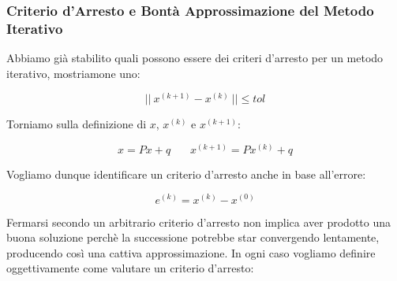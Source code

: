 \documentclass{article}
\begin{document}
\newpage

\subsubsection{Criterio d'Arresto e Bontà Approssimazione del Metodo Iterativo}

Abbiamo già stabilito quali possono essere dei criteri d'arresto per un metodo iterativo, mostriamone uno:

\[ ||\: x^{(k+1)} - x^{(k)} \:|| \leq tol \]

Torniamo sulla definizione di $x$, $x^{(k)}$ e $x^{(k+1)}$:

\[ \boxed{x = Px + q} \: \: \: \: \: \: \: \: \boxed{x^{(k+1)} = Px^{(k)}+q} \]

Vogliamo dunque identificare un criterio d'arresto anche in base all'errore:

\[ e^{(k)} = x^{(k)} - x^{(0)} \]

Fermarsi secondo un arbitrario criterio d'arresto non implica aver prodotto una buona soluzione perchè la successione potrebbe star convergendo lentamente, producendo così una cattiva approssimazione.
In ogni caso vogliamo definire oggettivamente come valutare un criterio d'arresto:
\end{document}
